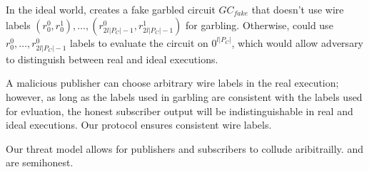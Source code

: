 In the ideal world, \Sim creates a fake garbled circuit $GC_{fake}$ that
doesn't use wire labels $(r_0^0, r_0^1), \ldots, (r_{2l|P_C|-1}^0
,r_{2l|P_C|-1}^1)$ for garbling. Otherwise, \Adv could use $r_0^0, \ldots,
r_{2l|P_C|-1}^0$ labels to evaluate the circuit on $0^{l|P_C|}$, which would
allow adversary to distinguish between real and ideal executions.

A malicious publisher can choose arbitrary wire labels in the real execution;
however, as long as the labels used in garbling are consistent with the labels
used for evluation, the honest subscriber output will be indistinguishable in
real and ideal executions. Our protocol ensures consistent wire labels. 

Our threat model allows for publishers and subscribers to collude aribitrailly.
\broker and \garbler are semihonest.


%
%
%
%
%
%
%
%
%
